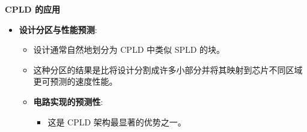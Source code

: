 \documentclass[
  ignorenonframetext,
  chinese,
]{beamer}
\providecommand{\tightlist}{%
  \setlength{\itemsep}{0pt}\setlength{\parskip}{0pt}}
\begin{document}
\begin{frame}
\begin{block}{\textbf{CPLD 的应用}}
\begin{itemize}
  \begin{itemize}
  \tightlist
  \item
    \textbf{可重复编程}:

    \begin{itemize}
    \tightlist
    \item
      所有商用 CPLD 产品都支持重新编程，简化了设计变更。
    \end{itemize}
  \item
    \textbf{系统内编程}:

    \begin{itemize}
    \tightlist
    \item
      支持在不停机的情况下重新配置硬件（例如更改通信电路的协议）。
    \end{itemize}
  \end{itemize}
\item
  \textbf{设计分区与性能预测}:

  \begin{itemize}
  \tightlist
  \item
    设计通常自然地划分为 CPLD 中类似 SPLD 的块。
  \item
    这种分区的结果是比将设计分割成许多小部分并将其映射到芯片不同区域更可预测的速度性能。
  \item
    \textbf{电路实现的预测性}:

    \begin{itemize}
    \tightlist
    \item
      这是 CPLD 架构最显著的优势之一。
    \end{itemize}
  \end{itemize}
\end{itemize}
\end{block}
\end{frame}
\end{document}
